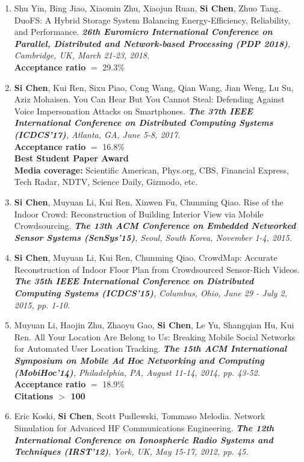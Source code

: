 \documentclass[letter]{article}
\newcommand{\publication}[4]{\item #1. #2. \emph{#3.} #4}
\begin{document}
\begin{description}
\begin{enumerate}[{C-}1.]
\publication{Shu Yin, Bing Jiao, Xiaomin Zhu, Xiaojun Ruan, \textbf{Si Chen}, Zhuo Tang} {DuoFS: A Hybrid Storage System Balancing Energy-Efficiency, Reliability, and Performance}  {\textbf{26th Euromicro International Conference on Parallel, Distributed and Network-based Processing (PDP 2018)}, Cambridge, UK, March 21-23, 2018} \\
\textbf{Acceptance ratio} $=$ 29.3\% \\

\publication{\textbf{Si Chen}, Kui Ren, Sixu Piao, Cong Wang, Qian Wang, Jian Weng, Lu Su, Aziz Mohaisen} {You Can Hear But You Cannot Steal: Defending Against Voice Impersonation Attacks on Smartphones}  {\textbf{The 37th IEEE International Conference on Distributed Computing Systems (ICDCS'17)}, Atlanta, GA, June 5-8, 2017} \\
\textbf{Acceptance ratio} $=$ 16.8\% \\
\textbf{Best Student Paper Award} \\
\textbf{Media coverage: }Scientific American, Phys.org, CBS, Financial Express, Tech Radar, NDTV, Science Daily, Gizmodo, etc.\\

\publication{\textbf{Si Chen}, Muyuan Li, Kui Ren, Xinwen Fu, Chunming Qiao} {Rise of the Indoor Crowd: Reconstruction of Building Interior View via Mobile Crowdsourcing}  {\textbf{The 13th ACM Conference on Embedded Networked Sensor Systems (SenSys'15)}, Seoul, South Korea, November 1-4, 2015} \\

\publication{\textbf{Si Chen}, Muyuan Li, Kui Ren, Chunming Qiao} {CrowdMap: Accurate Reconstruction of Indoor Floor Plan from Crowdsourced Sensor-Rich Videos}  {\textbf{The 35th IEEE International Conference on Distributed Computing Systems (ICDCS'15)}, Columbus, Ohio, June 29 - July 2, 2015, pp. 1-10} \\

\publication{Muyuan Li, Haojin Zhu, Zhaoyu Gao, \textbf{Si Chen}, Le Yu, Shangqian Hu, Kui Ren} {All Your Location Are Belong to Us: Breaking Mobile Social Networks for Automated User Location Tracking}  {\textbf{The 15th ACM International Symposium on Mobile Ad Hoc Networking and Computing (MobiHoc'14)}, Philadelphia, PA, August 11-14, 2014, pp. 43-52} \\
\textbf{Acceptance ratio} $=$ 18.9\% \\
\textbf{Citations $>$ 100} \\

\publication{Eric Koski, \textbf{Si Chen}, Scott Pudlewski, Tommaso Melodia} {Network Simulation for Advanced HF Communications Engineering}  {\textbf{The 12th International Conference on Ionospheric Radio Systems and Techniques (IRST'12)}, York, UK, May 15-17, 2012, pp. 45}\\


\end{enumerate}
\end{description}
\end{document}
